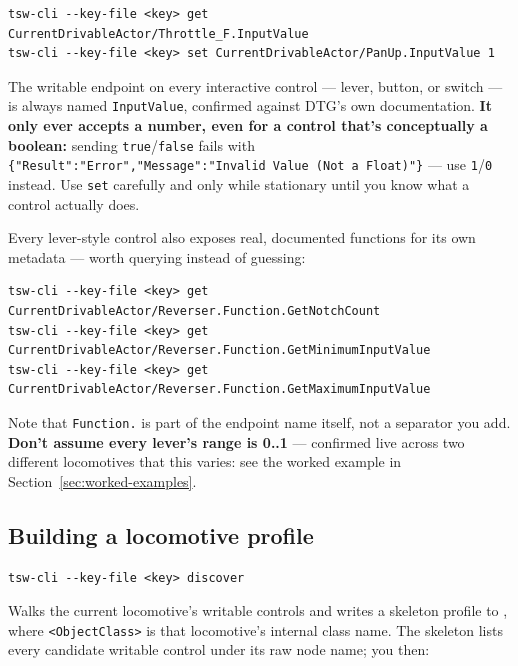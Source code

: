 \documentclass[11pt,a4paper]{article}
\newcommand{\code}[1]{\texttt{#1}}
\begin{document}
\begin{lstlisting}
tsw-cli --key-file <key> get CurrentDrivableActor/Throttle_F.InputValue
tsw-cli --key-file <key> set CurrentDrivableActor/PanUp.InputValue 1
\end{lstlisting}

The writable endpoint on every interactive control --- lever, button, or
switch --- is always named \code{InputValue}, confirmed against DTG's own
documentation. \textbf{It only ever accepts a number, even for a control
that's conceptually a boolean:} sending \code{true}/\code{false} fails
with \code{\{"Result":"Error","Message":"Invalid Value (Not a Float)"\}}
--- use \code{1}/\code{0} instead. Use \code{set} carefully and only while
stationary until you know what a control actually does.

Every lever-style control also exposes real, documented functions for its
own metadata --- worth querying instead of guessing:

\begin{lstlisting}
tsw-cli --key-file <key> get CurrentDrivableActor/Reverser.Function.GetNotchCount
tsw-cli --key-file <key> get CurrentDrivableActor/Reverser.Function.GetMinimumInputValue
tsw-cli --key-file <key> get CurrentDrivableActor/Reverser.Function.GetMaximumInputValue
\end{lstlisting}

Note that \code{Function.} is part of the endpoint name itself, not a
separator you add. \textbf{Don't assume every lever's range is 0..1} ---
confirmed live across two different locomotives that this varies: see the
worked example in Section~\ref{sec:worked-examples}.

\subsection{Building a locomotive profile}
\label{sec:discover}

\begin{lstlisting}
tsw-cli --key-file <key> discover
\end{lstlisting}

Walks the current locomotive's writable controls and writes a skeleton
profile to , where \code{<ObjectClass>}
is that locomotive's internal class name. The skeleton lists every
candidate writable control under its raw node name; you then:
\end{document}

